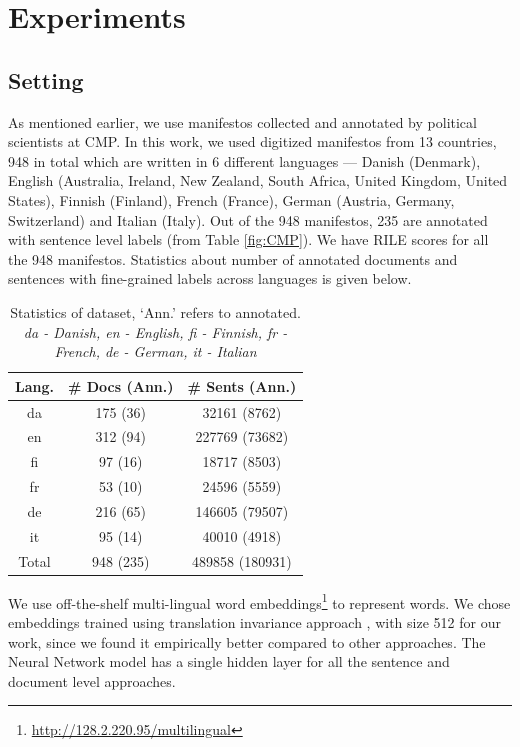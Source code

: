 \documentclass[11pt,a4paper]{article}
\begin{document}
\section{Experiments}
\subsection{Setting}
As mentioned earlier, we use manifestos collected and annotated by political scientists at CMP. In this work, we used digitized manifestos from 13 countries, 948 in total which are written in 6 different languages --- Danish (Denmark), English (Australia, Ireland, New Zealand, South Africa, United Kingdom, United States), Finnish (Finland), French (France), German (Austria, Germany, Switzerland) and Italian (Italy). Out of the 948 manifestos, 235 are annotated with sentence level labels (from Table \ref{fig:CMP}). We have RILE scores for all the 948 manifestos. Statistics about number of annotated documents and sentences with fine-grained labels across languages is given below.
 \begin{table}[!htp]
  \centering
  \begin{tabular}{ c c c }
  \toprule
    Lang. & \# Docs (Ann.) & \# Sents (Ann.)\\
    \midrule
    da  & 175 (36)  &  32161 (8762)	\\
    en   &  312 (94)& 227769 (73682) 	 \\    	
    fi  &  97 (16) &  18717 (8503) \\
    fr    & 53 (10) & 24596 (5559)\\
    de    & 216 (65) & 146605 (79507) \\
    it    & 95 (14)  & 40010 (4918)\\
\midrule
 Total    & 948 (235)  & 489858 (180931)\\
    \bottomrule

  \end{tabular}
  \caption{Statistics of dataset, `Ann.' refers to annotated. \textit{da - Danish, en - English, fi - Finnish, fr - French, de - German, it - Italian}}
  \label{tab:al}
\end{table}

We use off-the-shelf multi-lingual word embeddings\footnote{\url{http://128.2.220.95/multilingual}} to represent words. We chose embeddings trained using translation invariance approach \cite{ammar2016massively}, with size 512 for our work, since we found it empirically better compared to other approaches. The Neural Network model has a single hidden layer for all the sentence and document level approaches. 
\end{document}
